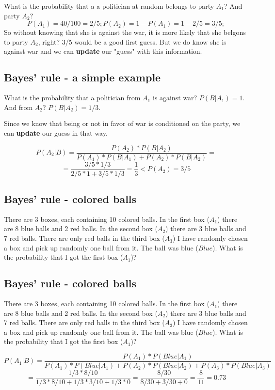 \documentclass[11pt]{article}
\begin{document}
	What is the probability that a a politician at random belongs to party $A_1$? And party $A_2$?
	\[P(A_1) = 40/100 = 2/5; P(A_2) = 1 - P(A_1) = 1 - 2/5 = 3/5;\]
	So without knowing that she is against the war, it is more likely that she belgons to party $A_2$, right? 3/5 would be a good first guess. But we do know she is against war and we can \textbf{update} our "guess" with this information.
	


	\subsection*{Bayes' rule - a simple example}
	What is the probability that a politician from $A_1$ is against war? $P(B|A_1) = 1$. And from $A_2$? $P(B|A_2) = 1/3$.
	
	Since we know that being or not in favor of war is conditioned on the party, we can \textbf{update} our guess in that way.
	
	\[P(A_2|B) = \frac{P(A_2)*P(B|A_2)}{P(A_1)*P(B|A_1)+P(A_2)*P(B|A_2)}=\]
	\[= \frac{3/5*1/3}{2/5*1+3/5*1/3} = \frac{1}{3} < P(A_2) = 3/5\]	
	


	\subsection*{Bayes' rule - colored balls}
	There are 3 boxes, each containing 10 colored balls. In the first box ($A_1$) there are 8 blue balls and 2 red balls. In the second box ($A_2$) there are 3 blue balls and 7 red balls. There are only red balls in the third box ($A_3$) I have randomly chosen a box and pick up randomly one ball from it. The ball was blue ($Blue$). What is the probability that I got the first box ($A_1$)?


	\subsection*{Bayes' rule - colored balls}
	There are 3 boxes, each containing 10 colored balls. In the first box ($A_1$) there are 8 blue balls and 2 red balls. In the second box ($A_2$) there are 3 blue balls and 7 red balls. There are only red balls in the third box ($A_3$) I have randomly chosen a box and pick up randomly one ball from it. The ball was blue ($Blue$). What is the probability that I got the first box ($A_1$)?
	
	\small{\[P(A_1|B) = \frac{P(A_1)*P(Blue|A_1)}{P(A_1)*P(Blue|A_1)+P(A_2)*P(Blue|A_2)+P(A_3)*P(Blue|A_3)}\]}
	\[= \frac{1/3*8/10}{1/3*8/10+1/3*3/10+1/3*0} = \frac{8/30}{8/30+3/30+0} = \frac{8}{11} = 0.73\] 
	
\end{document}
